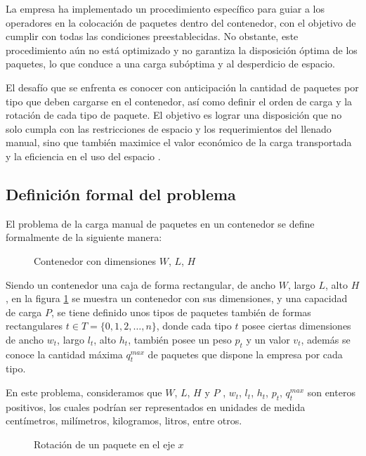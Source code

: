 \documentclass[openany]{article}
\begin{document}
La empresa ha implementado un procedimiento específico para guiar a los operadores en la colocación de paquetes dentro del contenedor, con el objetivo de cumplir con todas las condiciones preestablecidas. No obstante, este procedimiento aún no está optimizado y no garantiza la disposición óptima de los paquetes, lo que conduce a una carga subóptima y al desperdicio de espacio.

El desafío que se enfrenta es conocer con anticipación la cantidad de paquetes por tipo que deben cargarse en el contenedor, así como definir el orden de carga y la rotación de cada tipo de paquete. El objetivo es lograr una disposición que no solo cumpla con las restricciones de espacio y los requerimientos del llenado manual, sino que también maximice el valor económico de la carga transportada y la eficiencia en el uso del espacio .

\subsection{Definición formal del problema}

El problema de la carga manual de paquetes en un contenedor se define formalmente de la siguiente manera:

\begin{figure}[H]
    \centering
    
    \caption{Contenedor con dimensiones $W$, $L$, $H$}
    \label{fig:container}
\end{figure}

Siendo un contenedor una caja de forma rectangular, de ancho $W$, largo $L$, alto $H$, en la figura \ref{fig:container} se muestra un contenedor con sus dimensiones, y una capacidad de carga $P$, se tiene definido unos tipos de paquetes también de formas rectangulares $t \in T = \{0, 1, 2, \ldots, n\}$, donde cada tipo $t$ posee ciertas dimensiones de ancho $w_t$, largo $l_t$, alto $h_t$, también posee un peso $p_t$ y un valor $v_t$, además se conoce la cantidad máxima $q^{max}_t$ de paquetes que dispone la empresa por cada tipo.

En este problema, consideramos que $W$, $L$, $H$ y $P$ , $w_t$, $l_t$, $h_t$, $p_t$, $q^{max}_t$ son enteros positivos, los cuales podrían ser representados en unidades de medida centímetros, milímetros, kilogramos, litros, entre otros.

\begin{figure}[H]
    \centering
    
    \caption{Rotación de un paquete en el eje $x$}
    \label{fig:rotation}
\end{figure}
\end{document}

